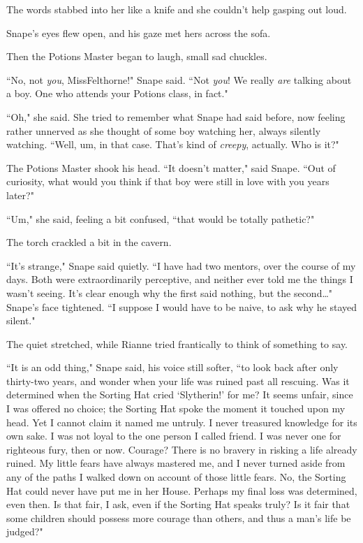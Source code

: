 The words stabbed into her like a knife and she couldn't help gasping out loud.

Snape's eyes flew open, and his gaze met hers across the sofa.

Then the Potions Master began to laugh, small sad chuckles.

``No, not \emph{you}, Miss\?Felthorne!" Snape said. ``Not \emph{you}! We really \emph{are} talking about a boy. One who attends your Potions class, in fact."

``Oh," she said. She tried to remember what Snape had said before, now feeling rather unnerved as she thought of some boy watching her, always silently watching. ``Well, um, in that case. That's kind of \emph{creepy}, actually. Who is it?"

The Potions Master shook his head. ``It doesn't matter," said Snape. ``Out of curiosity, what would you think if that boy were still in love with you years later?"

``Um," she said, feeling a bit confused, ``that would be totally pathetic?"

The torch crackled a bit in the cavern.

``It's strange," Snape said quietly. ``I have had two mentors, over the course of my days. Both were extraordinarily perceptive, and neither ever told me the things I wasn't seeing. It's clear enough why the first said nothing, but the second{\ldots}" Snape's face tightened. ``I suppose I would have to be naive, to ask why he stayed silent."

The quiet stretched, while Rianne tried frantically to think of something to say.

``It is an odd thing," Snape said, his voice still softer, ``to look back after only thirty-two years, and wonder when your life was ruined past all rescuing. Was it determined when the Sorting Hat cried `Slytherin!' for me? It seems unfair, since I was offered no choice; the Sorting Hat spoke the moment it touched upon my head. Yet I cannot claim it named me untruly. I never treasured knowledge for its own sake. I was not loyal to the one person I called friend. I was never one for righteous fury, then or now. Courage? There is no bravery in risking a life already ruined. My little fears have always mastered me, and I never turned aside from any of the paths I walked down on account of those little fears. No, the Sorting Hat could never have put me in her House. Perhaps my final loss was determined, even then. Is that fair, I ask, even if the Sorting Hat speaks truly? Is it fair that some children should possess more courage than others, and thus a man's life be judged?"

